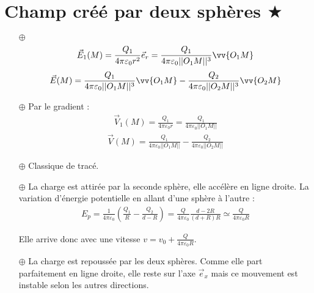 \documentclass{report}
\begin{document}
\section*{Champ créé par deux sphères $\bigstar$}

\begin{itemize}

	\item[$\oplus$] 
	\begin{align*}
		\vec{E}_1(M)=\frac{Q_1}{4\pi\varepsilon_0r^2}\vec{e}_r=\frac{Q_1}{4\pi\varepsilon_0||O_1M||^3}\vv{O_1M}
	\end{align*}
		\begin{align*}
		\vec{E}(M)=\frac{Q_1}{4\pi\varepsilon_0||O_1M||^3}\vv{O_1M}-\frac{Q_2}{4\pi\varepsilon_0||O_2M||^3}\vv{O_2M}
	\end{align*}
	
	\item[$\oplus$] Par le gradient :
		\begin{align*}
		\vec{V}_1(M)=\frac{Q_1}{4\pi\varepsilon_0r}=\frac{Q_1}{4\pi\varepsilon_0||O_1M||}
	    \end{align*}
	    \begin{align*}
		\vec{V}(M)=\frac{Q_1}{4\pi\varepsilon_0||O_1M||}-\frac{Q_2}{4\pi\varepsilon_0||O_2M||}
	    \end{align*}
	
	
	\item[$\oplus$] Classique de tracé.
	
	\item[$\oplus$] La charge est attirée par la seconde sphère, elle accélère en ligne droite. La variation d'énergie potentielle en allant d'une sphère à l'autre :
	\begin{align*}
		E_p=\frac{1}{4\pi\varepsilon_0}\left(\frac{Q_1}{R}-\frac{Q_2}{d-R} \right) =\frac{Q}{4\pi\varepsilon_0}\frac{d-2R}{(d+R)R}\simeq\frac{Q}{4\pi\varepsilon_0R}
	\end{align*}
	
	Elle arrive donc avec une vitesse $v=v_0+\frac{Q}{4\pi\varepsilon_0R}$.
	
	\item[$\oplus$] La charge est repoussée par les deux sphères. Comme elle part parfaitement en ligne droite, elle reste sur l'axe $\vec{e}_x$ mais ce mouvement est instable selon les autres directions. 

\end{itemize}
\end{document}
